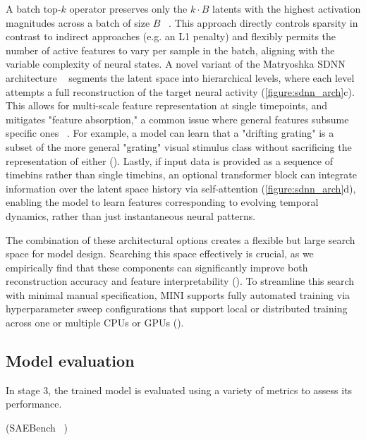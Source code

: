 A batch top-$k$ operator preserves only the $k \cdot B$ latents with the highest activation magnitudes across a batch of size $B$ ~\cite{bussmann_2024_batchtopk}. This approach directly controls sparsity in contrast to indirect approaches (e.g. an L1 penalty) and flexibly permits the number of active features to vary per sample in the batch, aligning with the variable complexity of neural states. A novel variant of the Matryoshka SDNN architecture ~\cite{bussmann_2025_msae} segments the latent space into hierarchical levels, where each level attempts a full reconstruction of the target neural activity (\autoref{figure:sdnn_arch}c). This allows for multi-scale feature representation at single timepoints, and mitigates "feature absorption," a common issue where general features subsume specific ones ~\cite{chanin_2024_feature_absorption}. For example, a model can learn that a "drifting grating" is a subset of the more general "grating" visual stimulus class without sacrificing the representation of either (). Lastly, if input data is provided as a sequence of timebins rather than single timebins, an optional transformer block can integrate information over the latent space history via self-attention (\autoref{figure:sdnn_arch}d), enabling the model to learn features corresponding to evolving temporal dynamics, rather than just instantaneous neural patterns. 

The combination of these architectural options creates a flexible but large search space for model design. Searching this space effectively is crucial, as we empirically find that these components can significantly improve both reconstruction accuracy and feature interpretability (). To streamline this search with minimal manual specification, MINI supports fully automated training via hyperparameter sweep configurations that support local or distributed training across one or multiple CPUs or GPUs ().

\subsection{Model evaluation}

In stage 3, the trained model is evaluated using a variety of metrics to assess its performance. 

(SAEBench ~\cite{karvonen_2025_saebench})

